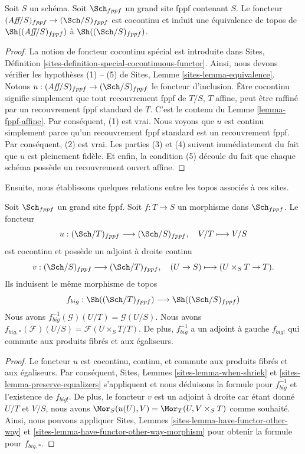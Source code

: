 \begin{lemma}
\label{lemma-affine-big-site-fppf}
Soit $S$ un schéma. Soit $\Sch_{fppf}$ un grand site fppf contenant $S$. Le foncteur $(\textit{Aff}/S)_{fppf} \to (\Sch/S)_{fppf}$ est cocontinu et induit une équivalence de topos de $\Sh((\textit{Aff}/S)_{fppf})$ à $\Sh((\Sch/S)_{fppf})$.
\end{lemma}

\begin{proof}
La notion de foncteur cocontinu spécial est introduite dans Sites, Définition \ref{sites-definition-special-cocontinuous-functor}. Ainsi, nous devons vérifier les hypothèses (1) -- (5) de Sites, Lemme \ref{sites-lemma-equivalence}. Notons $u : (\textit{Aff}/S)_{fppf} \to (\Sch/S)_{fppf}$ le foncteur d'inclusion. Être cocontinu signifie simplement que tout recouvrement fppf de $T/S$, $T$ affine, peut être raffiné par un recouvrement fppf standard de $T$. C'est le contenu du Lemme \ref{lemma-fppf-affine}. Par conséquent, (1) est vrai. Nous voyons que $u$ est continu simplement parce qu'un recouvrement fppf standard est un recouvrement fppf. Par conséquent, (2) est vrai. Les parties (3) et (4) suivent immédiatement du fait que $u$ est pleinement fidèle. Et enfin, la condition (5) découle du fait que chaque schéma possède un recouvrement ouvert affine.
\end{proof}

\noindent
Ensuite, nous établissons quelques relations entre les topos associés à ces sites.

\begin{lemma}
\label{lemma-morphism-big-fppf}
Soit $\Sch_{fppf}$ un grand site fppf. Soit $f : T \to S$ un morphisme dans $\Sch_{fppf}$. Le foncteur
$$
u : (\Sch/T)_{fppf} \longrightarrow (\Sch/S)_{fppf},
\quad
V/T \longmapsto V/S
$$
est cocontinu et possède un adjoint à droite continu
$$
v : (\Sch/S)_{fppf} \longrightarrow (\Sch/T)_{fppf},
\quad
(U \to S) \longmapsto (U \times_S T \to T).
$$
Ils induisent le même morphisme de topos
$$
f_{big} :
\Sh((\Sch/T)_{fppf})
\longrightarrow
\Sh((\Sch/S)_{fppf})
$$
Nous avons $f_{big}^{-1}(\mathcal{G})(U/T) = \mathcal{G}(U/S)$. Nous avons $f_{big, *}(\mathcal{F})(U/S) = \mathcal{F}(U \times_S T/T)$. De plus, $f_{big}^{-1}$ a un adjoint à gauche $f_{big!}$ qui commute aux produits fibrés et aux égaliseurs.
\end{lemma}

\begin{proof}
Le foncteur $u$ est cocontinu, continu, et commute aux produits fibrés et aux égaliseurs. Par conséquent, Sites, Lemmes \ref{sites-lemma-when-shriek} et \ref{sites-lemma-preserve-equalizers} s'appliquent et nous déduisons la formule pour $f_{big}^{-1}$ et l'existence de $f_{big!}$. De plus, le foncteur $v$ est un adjoint à droite car étant donné $U/T$ et $V/S$, nous avons $\Mor_S(u(U), V) = \Mor_T(U, V \times_S T)$ comme souhaité. Ainsi, nous pouvons appliquer Sites, Lemmes \ref{sites-lemma-have-functor-other-way} et \ref{sites-lemma-have-functor-other-way-morphism} pour obtenir la formule pour $f_{big, *}$.
\end{proof}


